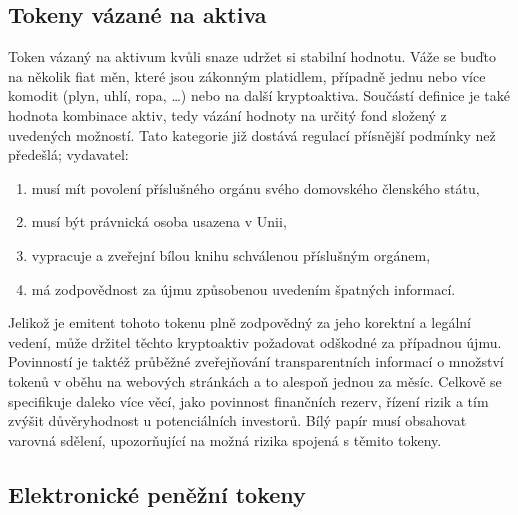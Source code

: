 \subsection{Tokeny vázané na aktiva}
Token vázaný na aktivum kvůli snaze udržet si stabilní hodnotu. Váže se buďto na několik fiat měn, které jsou zákonným platidlem, případně jednu nebo více komodit (plyn, uhlí, ropa, \ldots)
nebo na další kryptoaktiva. Součástí definice je také hodnota kombinace aktiv, tedy vázání hodnoty na určitý fond složený z uvedených možností. Tato kategorie již dostává regulací přísnější
podmínky než předešlá; vydavatel:
\begin{enumerate}
    \item musí mít povolení příslušného orgánu svého domovského členského státu,
    \item musí být právnická osoba usazena v Unii,
    \item vypracuje a zveřejní bílou knihu schválenou příslušným orgánem,
    \item má zodpovědnost za újmu způsobenou uvedením špatných informací.
\end{enumerate}
Jelikož je emitent tohoto tokenu plně zodpovědný za jeho korektní a legální vedení, může držitel těchto kryptoaktiv požadovat odškodné za případnou újmu. Povinností je taktéž
průběžné zveřejňování transparentních informací o množství tokenů v oběhu na webových stránkách a to alespoň jednou za měsíc. Celkově se specifikuje daleko více věcí, jako povinnost
finančních rezerv, řízení rizik a tím zvýšit důvěryhodnost u potenciálních investorů. Bílý papír musí obsahovat varovná sdělení, upozorňující na možná rizika spojená s těmito
tokeny.

\subsection{Elektronické peněžní tokeny}


\endinput